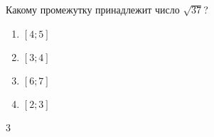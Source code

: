 \begin{ex}
	Какому промежутку принадлежит число $\sqrt{37}$?
	
	\selectanswer
	\begin{multicols}{4}
		\begin{enumerate}[label=\arabic*)]
			\item $[4;5]$
			\item $[3;4]$
			\item $[6;7]$
			\item $[2;3]$
		\end{enumerate}
	\end{multicols}
	\begin{answer}
		3
	\end{answer}
\end{ex}